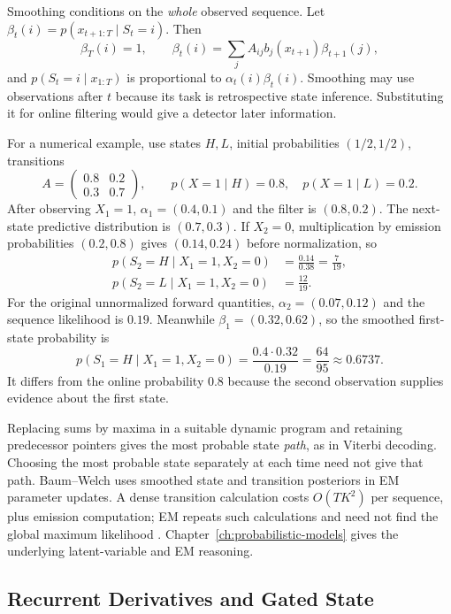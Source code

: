 Smoothing conditions on the \emph{whole} observed sequence. Let $\beta_t(i)=p(x_{t+1:T}\mid S_t=i)$. Then
\[
 \beta_T(i)=1,\qquad
 \beta_t(i)=\sum_j A_{ij}b_j(x_{t+1})\beta_{t+1}(j),
\]
and $p(S_t=i\mid x_{1:T})$ is proportional to $\alpha_t(i)\beta_t(i)$. Smoothing may use observations after $t$ because its task is retrospective state inference. Substituting it for online filtering would give a detector later information.

For a numerical example, use states $H,L$, initial probabilities $(1/2,1/2)$, transitions
\[
 A=\begin{pmatrix}0.8&0.2\\0.3&0.7\end{pmatrix},
 \qquad p(X=1\mid H)=0.8,\quad p(X=1\mid L)=0.2.
\]
After observing $X_1=1$, $\alpha_1=(0.4,0.1)$ and the filter is $(0.8,0.2)$. The next-state predictive distribution is $(0.7,0.3)$. If $X_2=0$, multiplication by emission probabilities $(0.2,0.8)$ gives $(0.14,0.24)$ before normalization, so
\begin{align*}
 p(S_2=H\mid X_1=1,X_2=0)&=\frac{0.14}{0.38}=\frac7{19},\\
 p(S_2=L\mid X_1=1,X_2=0)&=\frac{12}{19}.
\end{align*}
For the original unnormalized forward quantities, $\alpha_2=(0.07,0.12)$ and the sequence likelihood is $0.19$. Meanwhile $\beta_1=(0.32,0.62)$, so the smoothed first-state probability is
\[
 p(S_1=H\mid X_1=1,X_2=0)
 =\frac{0.4\cdot0.32}{0.19}=\frac{64}{95}\approx0.6737.
\]
It differs from the online probability $0.8$ because the second observation supplies evidence about the first state.

Replacing sums by maxima in a suitable dynamic program and retaining predecessor pointers gives the most probable state \emph{path}, as in Viterbi decoding. Choosing the most probable state separately at each time need not give that path. Baum--Welch uses smoothed state and transition posteriors in EM parameter updates. A dense transition calculation costs $O(TK^2)$ per sequence, plus emission computation; EM repeats such calculations and need not find the global maximum likelihood \citep{rabiner1989}. Chapter~\ref{ch:probabilistic-models} gives the underlying latent-variable and EM reasoning.

\subsection{Recurrent Derivatives and Gated State}

